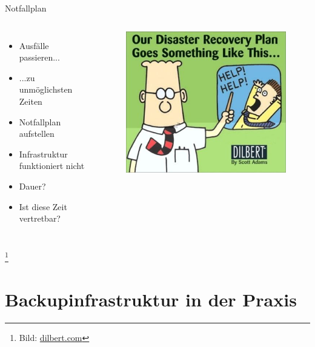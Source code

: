\documentclass[10pt]{beamer}
\newcommand\blfootnote[1]{%
	\begingroup
	\renewcommand\thefootnote{}\footnote{#1}%
	\addtocounter{footnote}{-1}%
	\endgroup
}
\begin{document}
%
%
\begin{frame}[fragile]{Notfallplan}
\begin{columns}[T,c,onlytextwidth]
	\begin{itemize}
		\item Ausfälle passieren...
		\item ...zu unmöglichsten Zeiten
		\item Notfallplan aufstellen
		\item Infrastruktur funktioniert nicht
		\item Dauer?
		\item Ist diese Zeit vertretbar?
	\end{itemize}
	\begin{figure}
		\includegraphics[width=1\textwidth]{images/dilbert}
	\end{figure}
\end{columns}

\blfootnote{Bild: \href{https://www.dilbert.com}{dilbert.com}}
\end{frame}

\section{Backupinfrastruktur in der Praxis}
\end{document}
